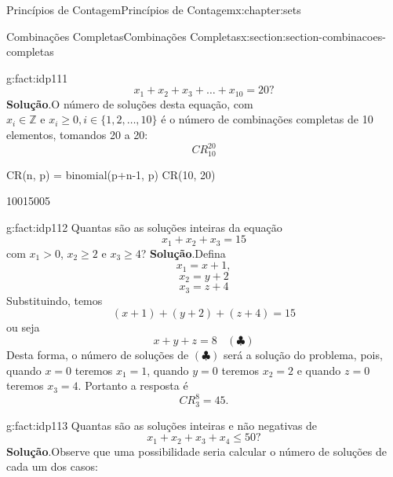 \documentclass[oneside,10pt,]{book}
\newcommand{\blocktitlefont}{\relax}
\numberwithin{equation}{section}
\begin{document}
\begin{chapterptx}{Princípios de Contagem}{}{Princípios de Contagem}{}{}{x:chapter:sets}
\begin{sectionptx}{Combinações Completas}{}{Combinações Completas}{}{}{x:section:section-combinacoes-completas}
\begin{fact}{}{}{g:fact:idp111}
\begin{equation*}
x_1 + x_2 + x_3 + \ldots + x_{10}  = 20?
\end{equation*}
%
\textbf{\blocktitlefont Solução}.\quad{}O número de soluções desta equação, com \(x_i\in \mathbb{Z} \text{ e } x_i\geq 0, i\in\{1, 2, \ldots, 10\}\)  é o  número de combinações completas de 10 elementos, tomandos 20 a 20:%
\begin{equation*}
CR_{10}^{20}
\end{equation*}
%
\begin{sageinput}
CR(n, p) = binomial(p+n-1, p) 
CR(10, 20)
\end{sageinput}
\begin{sageoutput}
10015005
\end{sageoutput}
\end{fact}
\begin{fact}{}{}{g:fact:idp112}%
Quantas são as soluções inteiras da equação%
\begin{equation*}
x_1 + x_2 + x_3 = 15
\end{equation*}
com \(x_1>0\), \(x_2\geq 2\) e \(x_3 \geq 4\)?%
\textbf{\blocktitlefont Solução}.\quad{}Defina%
\begin{equation*}
x_1 = x+1, 
\end{equation*}
%
\begin{equation*}
x_2 = y+2 
\end{equation*}
%
\begin{equation*}
x_3 = z+4 
\end{equation*}
Substituindo, temos%
\begin{equation*}
(x+1) + (y+2) + (z+4) = 15 
\end{equation*}
ou seja%
\begin{equation*}
x + y + z = 8 ~~~~ (\clubsuit) 
\end{equation*}
Desta forma, o número de soluções de \((\clubsuit)\) será a solução do problema, pois, quando \(x=0\) teremos \(x_1=1\), quando \(y=0\) teremos \(x_2=2\) e quando \(z=0\) teremos \(x_3=4\). Portanto a resposta é%
\begin{equation*}
CR_3^{8} = 45. 
\end{equation*}
%
\end{fact}
\begin{fact}{}{}{g:fact:idp113}%
Quantas são as soluções inteiras e não negativas de%
\begin{equation}
x_1 + x_2 + x_3 + x_4  \leq 50?\label{x:men:sol-desi}
\end{equation}
%
\textbf{\blocktitlefont Solução}.\quad{}Observe que uma possibilidade seria calcular o número de soluções de cada um dos casos:%

\end{fact}
\end{sectionptx}
\end{chapterptx}
\end{document}
